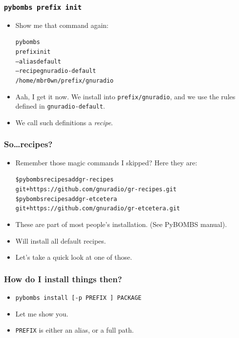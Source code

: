 \documentclass{beamer}
\begin{document}
\begin{frame}
  \frametitle{\texttt{pybombs prefix init}}
  \begin{itemize}
    \item Show me that command again:
      \begin{alltt}
      pybombs\\
          prefix init \\
          --alias default \\
          --recipe gnuradio-default \\
          /home/mbr0wn/prefix/gnuradio
      \end{alltt}
    \item Aah, I get it now. We install into \texttt{prefix/gnuradio}, and we use the rules defined in \texttt{gnuradio-default}.
    \item We call such definitions a \emph{recipe}.
  \end{itemize}
\end{frame}

\begin{frame}
  \frametitle{So\ldots recipes?}
  \begin{itemize}
    \item Remember those magic commands I skipped? Here they are:
      {\footnotesize{%
\begin{alltt}
\$ pybombs recipes add gr-recipes  \\
git+https://github.com/gnuradio/gr-recipes.git \\
\$ pybombs recipes add gr-etcetera\\
git+https://github.com/gnuradio/gr-etcetera.git
\end{alltt}
}}
    \item These are part of most people's installation. (See PyBOMBS manual).
    \item Will install all default recipes.
    \item Let's take a quick look at one of those.
  \end{itemize}
\end{frame}

\begin{frame}
  \frametitle{How do I install things then?}
  \begin{itemize}
    \item \texttt{pybombs install [-p PREFIX ] PACKAGE}
    \item Let me show you.
    \item \texttt{PREFIX} is either an alias, or a full path.
  \end{itemize}
\end{frame}
\end{document}
